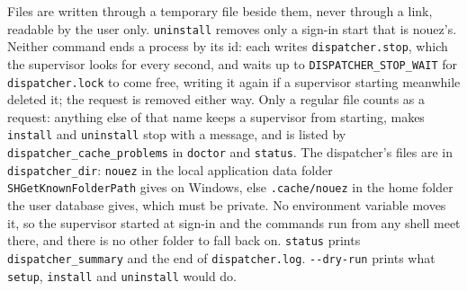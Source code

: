 \documentclass[10pt,a4paper]{article}
\newcommand{\code}[1]{\texttt{#1}}
\begin{document}
Files are written through a temporary file beside them, never through a link, readable by the
user only. \code{uninstall} removes only a sign-in start that is nouez's. Neither command ends
a process by its id: each writes \code{dispatcher.stop}, which the supervisor
looks for every second, and waits up to \code{DISPATCHER\_STOP\_WAIT} for \code{dispatcher.lock}
to come free, writing it again if a supervisor starting meanwhile deleted it; the request is
removed either way. Only a regular file counts as a request: anything else of that name keeps a
supervisor from starting, makes \code{install} and \code{uninstall} stop with a message, and is
listed by \code{dispatcher\_cache\_problems} in \code{doctor} and \code{status}. The dispatcher's
files are in \code{dispatcher\_dir}: \code{nouez} in the local application data folder
\code{SHGetKnownFolderPath} gives on Windows, else \code{.cache/nouez} in the home folder the
user database gives, which must be private. No environment variable moves it, so the
supervisor started at sign-in and the commands run from any shell meet there, and there is no
other folder to fall back on. \code{status} prints \code{dispatcher\_summary}
and the end of \code{dispatcher.log}. \code{-{}-dry-run} prints what \code{setup}, \code{install}
and \code{uninstall} would do.
\end{document}
